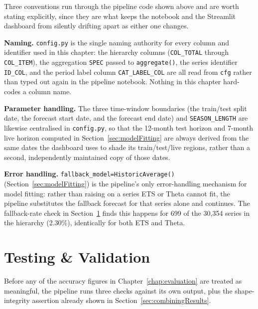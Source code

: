 Three conventions run through the pipeline code shown above and are worth stating explicitly, since they are what keeps the notebook and the Streamlit dashboard from silently drifting apart as either one changes.

\textbf{Naming.} \texttt{config.py} is the single naming authority for every column and identifier used in this chapter: the hierarchy columns (\texttt{COL\_TOTAL} through \texttt{COL\_ITEM}), the aggregation \texttt{SPEC} passed to \texttt{aggregate()}, the series identifier \texttt{ID\_COL}, and the period label column \texttt{CAT\_LABEL\_COL} are all read from \texttt{cfg} rather than typed out again in the pipeline notebook. Nothing in this chapter hard-codes a column name.

\textbf{Parameter handling.} The three time-window boundaries (the train/test split date, the forecast start date, and the forecast end date) and \texttt{SEASON\_LENGTH} are likewise centralised in \texttt{config.py}, so that the 12-month test horizon and 7-month live horizon computed in Section~\ref{sec:modelFitting} are always derived from the same dates the dashboard uses to shade its train/test/live regions, rather than a second, independently maintained copy of those dates.

\textbf{Error handling.} \texttt{fallback\_model=HistoricAverage()} (Section~\ref{sec:modelFitting}) is the pipeline's only error-handling mechanism for model fitting: rather than raising on a series ETS or Theta cannot fit, the pipeline substitutes the fallback forecast for that series alone and continues. The fallback-rate check in Section~\ref{sec:testingValidation} finds this happens for 699 of the 30,354 series in the hierarchy (2.30\%), identically for both ETS and Theta.

\section{Testing \& Validation}
\label{sec:testingValidation}

Before any of the accuracy figures in Chapter~\ref{chap:evaluation} are treated as meaningful, the pipeline runs three checks against its own output, plus the shape-integrity assertion already shown in Section~\ref{sec:combiningResults}.

